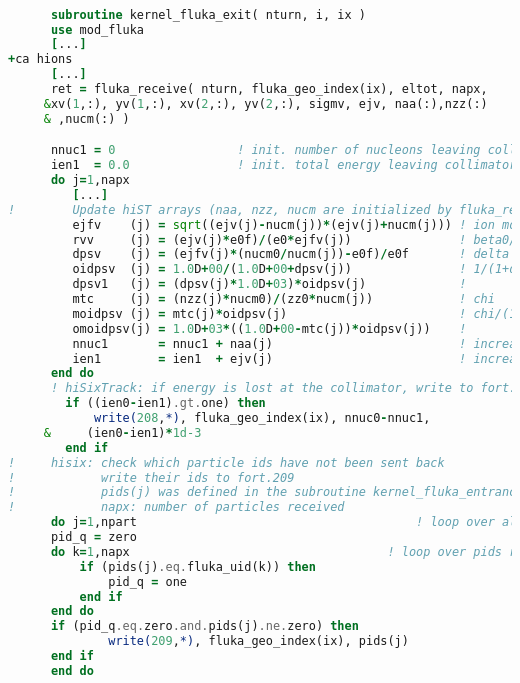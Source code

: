 \vspace{0.5cm}
\begin{minipage}{\linewidth}
\begin{lstlisting}[language=Fortran,caption=Receive particles from FLUKA as implemented in hiSixTrack.,label=lst:coupling_send]

      subroutine kernel_fluka_exit( nturn, i, ix )
      use mod_fluka
      [...]
+ca hions
      [...]
      ret = fluka_receive( nturn, fluka_geo_index(ix), eltot, napx,     &
     &xv(1,:), yv(1,:), xv(2,:), yv(2,:), sigmv, ejv, naa(:),nzz(:)     &
     & ,nucm(:) ) 

      nnuc1 = 0                 ! init. number of nucleons leaving collimator
      ien1  = 0.0               ! init. total energy leaving collimator
      do j=1,napx
         [...]
!        Update hiST arrays (naa, nzz, nucm are initialized by fluka_receive)
         ejfv    (j) = sqrt((ejv(j)-nucm(j))*(ejv(j)+nucm(j))) ! ion momentum
         rvv     (j) = (ejv(j)*e0f)/(e0*ejfv(j))               ! beta0/beta
         dpsv    (j) = (ejfv(j)*(nucm0/nucm(j))-e0f)/e0f       ! delta
         oidpsv  (j) = 1.0D+00/(1.0D+00+dpsv(j))               ! 1/(1+delta)
         dpsv1   (j) = (dpsv(j)*1.0D+03)*oidpsv(j)             ! 
         mtc     (j) = (nzz(j)*nucm0)/(zz0*nucm(j))            ! chi
         moidpsv (j) = mtc(j)*oidpsv(j)                        ! chi/(1+delta)
         omoidpsv(j) = 1.0D+03*((1.0D+00-mtc(j))*oidpsv(j))    ! 
         nnuc1       = nnuc1 + naa(j)                          ! increase nucleon counter
         ien1        = ien1  + ejv(j)                          ! increase energy counter
      end do
      ! hiSixTrack: if energy is lost at the collimator, write to fort.208
        if ((ien0-ien1).gt.one) then
            write(208,*), fluka_geo_index(ix), nnuc0-nnuc1,             &
     &     (ien0-ien1)*1d-3
        end if
!     hisix: check which particle ids have not been sent back
!            write their ids to fort.209
!            pids(j) was defined in the subroutine kernel_fluka_entrance
!            napx: number of particles received 
      do j=1,npart                                       ! loop over all pids possible
	  pid_q = zero
	  do k=1,napx                                    ! loop over pids received
	      if (pids(j).eq.fluka_uid(k)) then
	          pid_q = one
	      end if
	  end do
	  if (pid_q.eq.zero.and.pids(j).ne.zero) then
              write(209,*), fluka_geo_index(ix), pids(j)
	  end if
      end do
\end{lstlisting}
\end{minipage}

